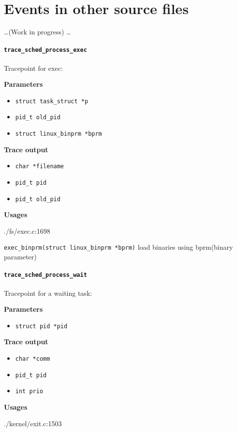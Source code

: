 \section{Events in other source files}
\dots (Work in progress) \dots
\paragraph{\texttt{trace\_sched\_process\_exec}}
Tracepoint for exec:

\textbf{Parameters}
\begin{itemize}
    \item \verb|struct task_struct *p|
    \item \verb|pid_t old_pid|
    \item \verb|struct linux_binprm *bprm|
\end{itemize}

\textbf{Trace output}
\begin{itemize}
    \item \verb|char *filename| %
    \item \verb|pid_t pid|
    \item \verb|pid_t old_pid|
\end{itemize}

\textbf{Usages}
\begin{code}
./fs/exec.c:1698
\end{code}
\verb|exec_binprm(struct linux_binprm *bprm)|
load binaries using bprm(binary parameter)
  
\paragraph{\texttt{trace\_sched\_process\_wait}}
Tracepoint for a waiting task:

\textbf{Parameters}
\begin{itemize}
    \item \verb|struct pid *pid|
\end{itemize}

\textbf{Trace output}
\begin{itemize}
    \item \verb|char *comm|
    \item \verb|pid_t pid|
    \item \verb|int prio|
\end{itemize}

\textbf{Usages}
\begin{code}
./kernel/exit.c:1503
\end{code}

